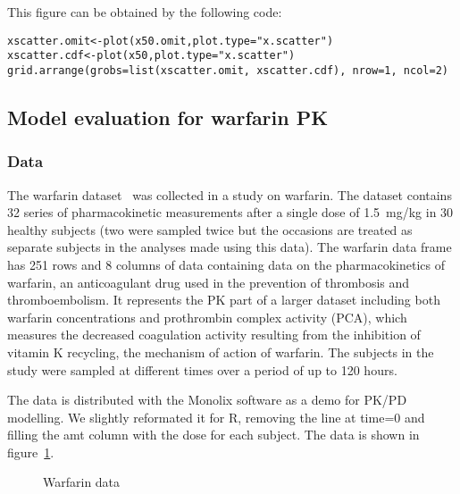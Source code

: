 This figure can be obtained by the following code:
\begin{verbatim}
xscatter.omit<-plot(x50.omit,plot.type="x.scatter")
xscatter.cdf<-plot(x50,plot.type="x.scatter")
grid.arrange(grobs=list(xscatter.omit, xscatter.cdf), nrow=1, ncol=2)
\end{verbatim} 

\clearpage
\subsection{Model evaluation for warfarin PK} \label{sec:warfarin}

\subsubsection{Data}

\hskip 18pt The warfarin dataset~\cite{OReilly68} was collected in a study on warfarin. The dataset contains 32 series of pharmacokinetic measurements after a single dose of 1.5~mg/kg in 30 healthy subjects (two were sampled twice but the occasions are treated as separate subjects in the analyses made using this data). 
The {\sf warfarin} data frame has 251 rows and 8 columns of data containing data on the pharmacokinetics of warfarin, an anticoagulant drug used in the prevention of thrombosis and thromboembolism. It represents the PK part of a larger dataset including both warfarin concentrations and prothrombin complex activity (PCA), which measures the decreased coagulation  activity resulting from the inhibition of vitamin K recycling, the mechanism of  action of warfarin. The subjects in the study were sampled at different times over a period of up to 120 hours.

The data is distributed with the {\sf Monolix} software as a demo for PK/PD modelling. We slightly reformated it for R, removing the line at time=0 and filling the {\sf amt} column with the dose for each subject. The data is shown in figure~\ref{fig:warfarin.data}.

\begin{figure}[!h]
\par\kern -0.2cm
\begin{center}
\end{center}
\caption{Warfarin data}\label{fig:warfarin.data}
\end{figure}


